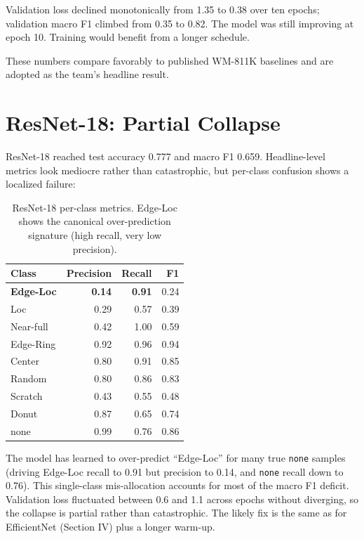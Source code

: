 \documentclass[conference]{IEEEtran}
\begin{document}
Validation loss declined monotonically from 1.35 to 0.38 over ten epochs;
validation macro F1 climbed from 0.35 to 0.82. The model was still
improving at epoch 10. Training would benefit from a longer schedule.

These numbers compare favorably to published WM-811K baselines and are
adopted as the team's headline result.

\section{ResNet-18: Partial Collapse}

ResNet-18 reached test accuracy 0.777 and macro F1 0.659. Headline-level
metrics look mediocre rather than catastrophic, but per-class confusion
shows a localized failure:

\begin{table}[H]
\centering
\begin{tabular}{lrrr}
\toprule
Class & Precision & Recall & F1 \\
\midrule
\textbf{Edge-Loc} & \textbf{0.14} & \textbf{0.91} & 0.24 \\
Loc               & 0.29 & 0.57 & 0.39 \\
Near-full         & 0.42 & 1.00 & 0.59 \\
Edge-Ring         & 0.92 & 0.96 & 0.94 \\
Center            & 0.80 & 0.91 & 0.85 \\
Random            & 0.80 & 0.86 & 0.83 \\
Scratch           & 0.43 & 0.55 & 0.48 \\
Donut             & 0.87 & 0.65 & 0.74 \\
none              & 0.99 & 0.76 & 0.86 \\
\bottomrule
\end{tabular}
\caption{ResNet-18 per-class metrics. Edge-Loc shows the canonical
over-prediction signature (high recall, very low precision).}
\end{table}

The model has learned to over-predict ``Edge-Loc'' for many true
\texttt{none} samples (driving Edge-Loc recall to 0.91 but precision to
0.14, and \texttt{none} recall down to 0.76). This single-class
mis-allocation accounts for most of the macro F1 deficit. Validation loss
fluctuated between 0.6 and 1.1 across epochs without diverging, so the
collapse is partial rather than catastrophic. The likely fix is the same
as for EfficientNet (Section IV) plus a longer warm-up.
\end{document}
